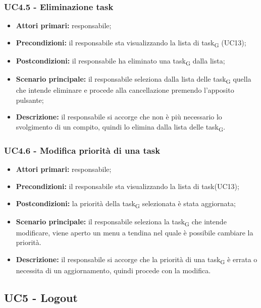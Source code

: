 \subsubsection{UC4.5 - Eliminazione task}

\begin{itemize}
	\item 	\textbf{Attori primari:} responsabile;
	\item 	\textbf{Precondizioni:} il responsabile sta visualizzando la lista di \gls{task}\textsubscript{G} (UC13);
	\item 	\textbf{Postcondizioni:} il responsabile ha eliminato una \gls{task}\textsubscript{G} dalla lista;
	\item 	\textbf{Scenario principale:} il responsabile seleziona dalla lista delle \gls{task}\textsubscript{G} quella che intende eliminare e procede alla cancellazione premendo l'apposito pulsante;
	\item 	\textbf{Descrizione:} il responsabile si accorge che non è più necessario lo svolgimento di un compito, quindi lo elimina dalla lista delle \gls{task}\textsubscript{G}.

\end{itemize}

\subsubsection{UC4.6 - Modifica priorità di una task}
\begin{itemize}
	\item 	\textbf{Attori primari:} responsabile;
	\item 	\textbf{Precondizioni:} il responsabile sta visualizzando la lista di task(UC13);
	\item 	\textbf{Postcondizioni:} la priorità della \gls{task}\textsubscript{G} selezionata è stata aggiornata;
	\item 	\textbf{Scenario principale:} il responsabile seleziona la \gls{task}\textsubscript{G} che intende modificare, viene aperto un menu a tendina nel quale è possibile cambiare la priorità.
	\item 	\textbf{Descrizione:} il responsabile si accorge che la priorità di una \gls{task}\textsubscript{G} è errata o necessita di un aggiornamento, quindi procede con la modifica.
\end{itemize}

\subsection{UC5 - Logout}


